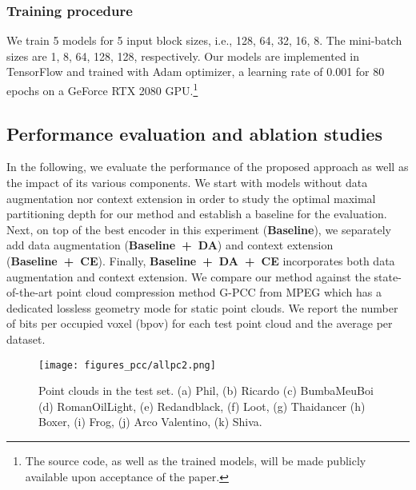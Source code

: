 \subsubsection{Training procedure} 
We train 5 models for 5 input block sizes, i.e., 128, 64, 32, 16, 8. The mini-batch sizes are 1, 8, 64, 128, 128, respectively. Our models are implemented in TensorFlow and trained with Adam \cite{adam} optimizer, a learning rate of 0.001 for 80 epochs on a GeForce RTX 2080 GPU.\footnote{The source code, as well as the trained models, will be made publicly available upon acceptance of the paper.}



\subsection{Performance evaluation and ablation studies}
In the following, we evaluate the performance of the proposed approach as well as the impact of its various components. We start with models without data augmentation nor context extension in order to study the optimal maximal partitioning depth for our method and establish a baseline for the evaluation. 
Next, on top of the best encoder in this experiment (\textbf{Baseline}), we separately add data augmentation (\textbf{Baseline~+~DA}) and context extension (\textbf{Baseline~+~CE}). Finally, \textbf{Baseline~+~DA~+~CE} incorporates both data augmentation and context extension. We compare our method against the state-of-the-art point cloud compression method G-PCC from MPEG \cite{graziosi2020overview} which has a dedicated lossless geometry mode for static point clouds. We report the number of bits per occupied voxel (bpov) for each test point cloud and the average per dataset.



\begin{figure}[tb]
\captionsetup{justification=raggedright}
\centering
\texttt{[image: figures\_pcc/allpc2.png]}
\caption{Point clouds in the test set. (a) Phil, (b) Ricardo (c) BumbaMeuBoi (d) RomanOilLight, (e) Redandblack, (f) Loot, (g) Thaidancer (h) Boxer, (i) Frog, (j) Arco Valentino, (k) Shiva.}
\label{fig:test pcs}
\end{figure}
\setlength{\textfloatsep}{20pt}


